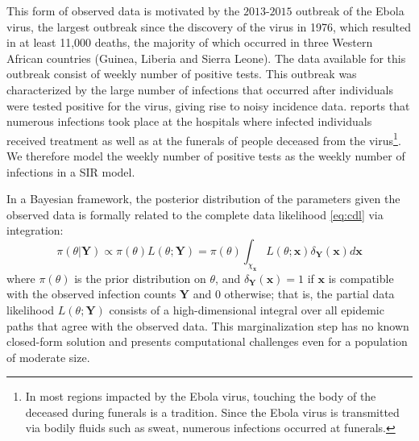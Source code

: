 \documentclass[12pt]{article}
\begin{document}
	This form of observed data is motivated by the $2013$-$2015$ outbreak of the Ebola virus, the largest outbreak since the discovery of the virus in 1976, which resulted in at least 11,000 deaths, the majority of which occurred in three Western African countries (Guinea, Liberia and Sierra Leone). The data available for this outbreak consist of weekly number of positive tests. This outbreak was characterized by the large number of infections that occurred after individuals were tested positive for the virus, giving rise to noisy incidence data. \cite{Coltart.2017} reports that numerous infections took place at the hospitals where infected individuals received treatment as well as at the funerals of people deceased from the virus\footnote{In most regions impacted by the Ebola virus, touching the body of the deceased during funerals is a tradition. Since the Ebola virus is transmitted via bodily fluids such as sweat, numerous infections occurred at funerals.}. We therefore model the weekly number of positive tests as the weekly number of infections in a SIR model.
	
	
	In a Bayesian framework, the posterior distribution of the parameters given the observed data is formally related to the complete data likelihood \eqref{eq:cdl} via integration:
	\begin{equation}
		\label{eq:pdl}
		\pi(\theta|\mathbf{Y}) 
		\propto \pi(\theta) L(\theta; \mathbf{Y}) = \pi(\theta) \int_{\chi_\mathbf{x}} L(\theta; \mathbf{x}) \delta_{\mathbf{Y}}(\mathbf{x}) d\mathbf{x}
	\end{equation}
	where $\pi(\theta)$ is the prior distribution on $\theta$, and
	$\delta_{\mathbf{Y}}(\mathbf{x}) = 1$ if $\mathbf{x}$ is compatible with the observed infection counts $\mathbf{Y}$ and $0$ otherwise; that is, the partial data likelihood $L(\theta; \mathbf{Y})$ consists of a high-dimensional integral over all epidemic paths that agree with the observed data. This marginalization step has no known closed-form solution and presents computational challenges even for a population of moderate size.
	
\end{document}
